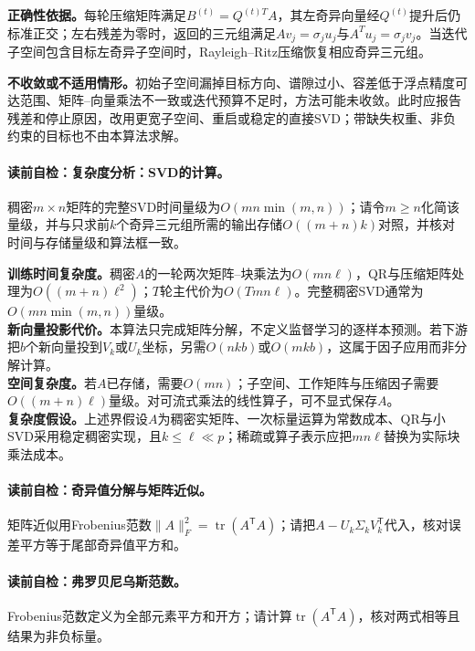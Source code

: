 \textbf{正确性依据。}每轮压缩矩阵满足$B^{(t)}=Q^{(t)T}A$，其左奇异向量经$Q^{(t)}$提升后仍标准正交；左右残差为零时，返回的三元组满足$Av_j=\sigma_ju_j$与$A^Tu_j=\sigma_jv_j$。当迭代子空间包含目标左奇异子空间时，Rayleigh--Ritz压缩恢复相应奇异三元组。

\textbf{不收敛或不适用情形。}初始子空间漏掉目标方向、谱隙过小、容差低于浮点精度可达范围、矩阵--向量乘法不一致或迭代预算不足时，方法可能未收敛。此时应报告残差和停止原因，改用更宽子空间、重启或稳定的直接SVD；带缺失权重、非负约束的目标也不由本算法求解。

\label{struct:V4-C03-CH26}
\label{struct:V4-C03-CH27}
\paragraph{读前自检：复杂度分析：SVD的计算。}稠密$m\times n$矩阵的完整SVD时间量级为$O(mn\min(m,n))$；请令$m\ge n$化简该量级，并与只求前$k$个奇异三元组所需的输出存储$O((m+n)k)$对照，并核对时间与存储量级和算法框一致。\par

\begin{complexitybox}
\textbf{训练时间复杂度。}稠密$A$的一轮两次矩阵--块乘法为$O(mn\ell)$，QR与压缩矩阵处理为$O((m+n)\ell^2)$；$T$轮主代价为$O(Tmn\ell)$。完整稠密SVD通常为$O(mn\min(m,n))$量级。\\
\textbf{新向量投影代价。}本算法只完成矩阵分解，不定义监督学习的逐样本预测。若下游把$b$个新向量投到$V_k$或$U_k$坐标，另需$O(nkb)$或$O(mkb)$，这属于因子应用而非分解计算。\\
\textbf{空间复杂度。}若$A$已存储，需要$O(mn)$；子空间、工作矩阵与压缩因子需要$O((m+n)\ell)$量级。对可流式乘法的线性算子，可不显式保存$A$。\\
\textbf{复杂度假设。}上述界假设$A$为稠密实矩阵、一次标量运算为常数成本、QR与小SVD采用稳定稠密实现，且$k\leq\ell\ll p$；稀疏或算子表示应把$mn\ell$替换为实际块乘法成本。
\end{complexitybox}

\paragraph{读前自检：奇异值分解与矩阵近似。}矩阵近似用Frobenius范数$\lVert A\rVert_F^2=\operatorname{tr}(A^{\mathsf T}A)$；请把$A-U_k\Sigma_kV_k^{\mathsf T}$代入，核对误差平方等于尾部奇异值平方和。\par
\paragraph{读前自检：弗罗贝尼乌斯范数。}Frobenius范数定义为全部元素平方和开方；请计算$\operatorname{tr}(A^{\mathsf T}A)$，核对两式相等且结果为非负标量。\par

